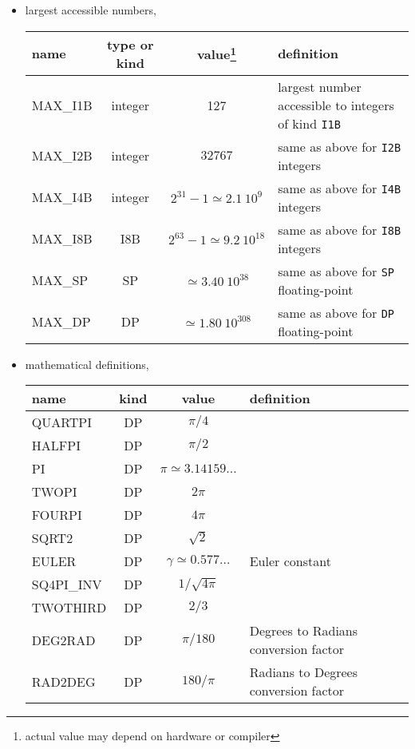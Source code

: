 \begin{itemize}
\item
largest accessible numbers, 

\begin{minipage}{\linewidth}{%
\renewcommand{\footnoterule}{}%
%
\begin{tabularx}{\linewidth}{lccX}
name & type or kind & value\footnote{\label{fn:healpix_types:max}%
actual value may depend on hardware or compiler} & definition \\
\hline
MAX\_I1B & integer & 127 & largest number accessible to integers of kind {\tt I1B}\\
MAX\_I2B & integer & $32767$ &
same as above for {\tt I2B} integers\\
MAX\_I4B & integer & $2^{31}-1 \simeq 2.1\ 10^9$& same as above for {\tt I4B} integers \\
MAX\_I8B & I8B & $2^{63}-1 \simeq 9.2\ 10^{18}$& same as above for {\tt I8B} integers \\
MAX\_SP & SP & $\simeq 3.40\ 10^{38}$ & same as above for {\tt SP} floating-point\\
MAX\_DP & DP & $\simeq 1.80\ 10^{308}$ & same as above for {\tt DP} floating-point\\
\hline
\end{tabularx}
}%
\end{minipage}

\item
mathematical definitions,%
%

\begin{minipage}{\linewidth}{%
\begin{tabularx}{\linewidth}{lccX}
name & kind & value & definition \\
\hline
QUARTPI & DP & $\pi/4$ & \\
HALFPI & DP & $\pi/2$ & \\
PI & DP & $\pi \simeq 3.14159\ldots$ & \\
TWOPI & DP & $2\pi$ & \\
FOURPI & DP & $4\pi$ & \\
SQRT2 & DP & $\sqrt{2}$ & \\
EULER & DP & $\gamma \simeq 0.577\ldots$ & Euler constant \\
SQ4PI\_INV & DP & $1/\sqrt{4\pi}$ & \\
TWOTHIRD & DP & $2/3$ & \\
DEG2RAD & DP & $\pi/180$ & Degrees to Radians conversion factor\\
RAD2DEG & DP & $180/\pi$ & Radians to Degrees conversion factor\\
\hline
\end{tabularx}
}
\end{minipage}


\end{itemize}
